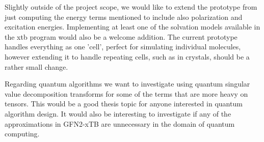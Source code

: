 Slightly outside of the project scope, we would like to extend the prototype from just computing the energy terms mentioned to include also polarization and excitation energies. Implementing at least one of the solvation models available in the xtb program would also be a welcome addition. The current prototype handles everything as one 'cell', perfect for simulating individual molecules, however extending it to handle repeating cells, such as in crystals, should be a rather small change. 

Regarding quantum algorithms we want to investigate using quantum singular value decomposition transforms for some of the terms that are more heavy on tensors. This would be a good thesis topic for anyone interested in quantum algorithm design. It would also be interesting to investigate if any of the approximations in GFN2-xTB are unnecessary in the domain of quantum computing.
